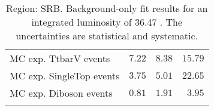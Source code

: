 \begin{table}
\begin{center}
{\begin{tabular*}{\textwidth}{@{\extracolsep{\fill}}lrrr}
        MC exp. TtbarV events         & $7.22$          & $8.38$          & $15.79$              \\
        MC exp. SingleTop events         & $3.75$          & $5.01$          & $22.65$              \\
        MC exp. Diboson events         & $0.81$          & $1.91$          & $3.95$              \\
\noalign{\smallskip}\hline\noalign{\smallskip}
\end{tabular*}
}
\end{center}
\caption{Region: SRB. Background-only fit results for an integrated luminosity of 36.47 \ifb. The uncertainties are statistical and systematic.
}
\label{table.bkgonly.SRB}
\end{table}
%